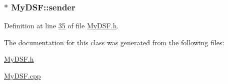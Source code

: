 \hypertarget{class_my_d_s_f_a0c9939346f14a4e8542a22bc5e17bd7a}{}
\subsubsection[{sender}]{$\ast$ My\+D\+S\+F\+::sender}\label{class_my_d_s_f_a0c9939346f14a4e8542a22bc5e17bd7a}


Definition at line \hyperlink{_my_d_s_f_8h_source_l00035}{35} of file \hyperlink{_my_d_s_f_8h_source}{My\+D\+S\+F.\+h}.



The documentation for this class was generated from the following files\+:\begin{DoxyCompactItemize}
\item 
\hyperlink{_my_d_s_f_8h}{My\+D\+S\+F.\+h}\item 
\hyperlink{_my_d_s_f_8cpp}{My\+D\+S\+F.\+cpp}\end{DoxyCompactItemize}
